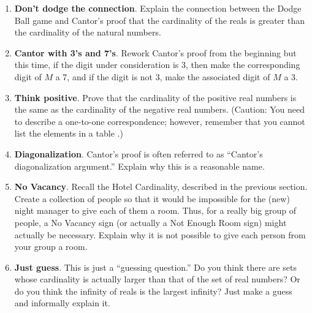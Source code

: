 \begin{enumerate}
	\item \textbf{Don't dodge the connection}. Explain the connection between the Dodge Ball game and Cantor's proof that the cardinality of the reals is greater than the cardinality of the natural numbers. \vfill

\item \textbf{Cantor with 3's and 7's}. Rework Cantor's proof from the beginning but this time, if the digit under consideration is 3, then make the corresponding digit of $M$ a 7, and if the digit is not 3, make the associated digit of $M$ a 3. \vfill

\item \textbf{Think positive}. Prove that the cardinality of the positive real numbers is the same as the cardinality of the negative real numbers. (Caution: You need to describe a one-to-one correspondence; however, remember that you cannot list the elements in a table .) \vfill

\item \textbf{Diagonalization}. Cantor's proof is often referred to as ``Cantor's diagonalization argument.'' Explain why this is a reasonable name. \vfill

\item  \textbf{No Vacancy}. Recall the Hotel Cardinality, described in the previous section. Create a collection of people so that it would be impossible for the (new) night manager to give each of them a room. Thus, for a really big group of people, a No Vacancy sign (or actually a Not Enough Room sign) might actually be necessary. Explain why it is not possible to give each person from your group a room. \vfill

\item \textbf{Just guess}. This is just a ``guessing question.'' Do you think there are sets whose cardinality is actually larger than that of the set of real numbers? Or do you think the infinity of reals is the largest infinity? Just make a guess and informally explain it. \vfill 

\end{enumerate}